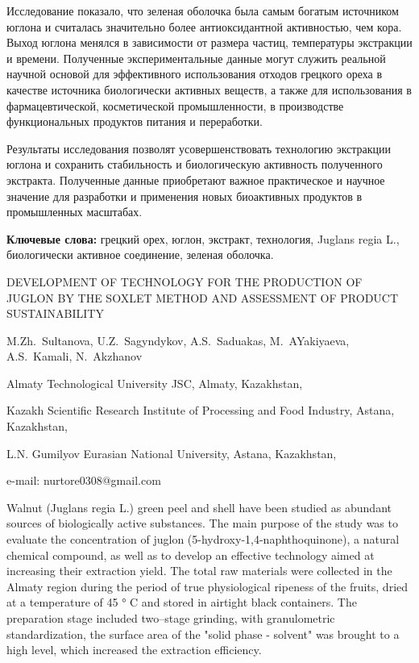 Исследование показало, что зеленая оболочка была самым богатым
источником юглона и считалась значительно более антиоксидантной
активностью, чем кора. Выход юглона менялся в зависимости от размера
частиц, температуры экстракции и времени. Полученные экспериментальные
данные могут служить реальной научной основой для эффективного
использования отходов грецкого ореха в качестве источника биологически
активных веществ, а также для использования в фармацевтической,
косметической промышленности, в производстве функциональных продуктов
питания и переработки.

Результаты исследования позволят усовершенствовать технологию экстракции
юглона и сохранить стабильность и биологическую активность полученного
экстракта. Полученные данные приобретают важное практическое и научное
значение для разработки и применения новых биоактивных продуктов в
промышленных масштабах.

{\bfseries Ключевые слова:} грецкий орех, юглон, экстракт, технология,
Juglans regia L., биологически активное соединение, зеленая оболочка.

\begin{header}
DEVELOPMENT OF TECHNOLOGY FOR THE PRODUCTION OF JUGLON BY THE SOXLET METHOD AND ASSESSMENT OF PRODUCT SUSTAINABILITY

M.Zh.~Sultanova,
U.Z.~Sagyndykov,
A.S.~Saduakas,
M.~AYakiyaeva,
A.S.~Kamali,
N.~Akzhanov\envelope
\end{header}

\begin{affil}
Almaty Technological University JSC, Almaty, Kazakhstan,

Kazakh Scientific Research Institute of Processing and Food Industry, Astana, Kazakhstan,

L.N. Gumilyov Eurasian National University, Astana, Kazakhstan,

e-mail: nurtore0308@gmail.com
\end{affil}

Walnut (Juglans regia L.) green peel and shell have been studied as
abundant sources of biologically active substances. The main purpose of
the study was to evaluate the concentration of juglon
(5-hydroxy-1,4-naphthoquinone), a natural chemical compound, as well as
to develop an effective technology aimed at increasing their extraction
yield. The total raw materials were collected in the Almaty region
during the period of true physiological ripeness of the fruits, dried at
a temperature of 45 ° C and stored in airtight black containers. The
preparation stage included two--stage grinding, with granulometric
standardization, the surface area of the "solid phase - solvent" was
brought to a high level, which increased the extraction efficiency.

